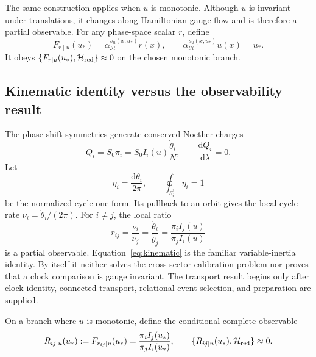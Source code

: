 \documentclass[11pt]{article}
\theoremstyle{plain}
\newcommand{\dd}{\mathrm d}
\begin{document}
The same construction applies when $u$ is monotonic. Although $u$ is invariant under translations, it changes along Hamiltonian gauge flow and is therefore a partial observable. For any phase-space scalar $r$, define
\begin{equation}
F_{r\mid u}(u_*)=\alpha_{\mathcal H}^{s_u(x,u_*)}r(x),\qquad
\alpha_{\mathcal H}^{s_u(x,u_*)}u(x)=u_*.
\end{equation}
It obeys $\{F_{r\mid u}(u_*),\mathcal H_{\rm red}\}\approx0$ on the chosen monotonic branch.

\subsection{Kinematic identity versus the observability result}

The phase-shift symmetries generate conserved Noether charges
\begin{equation}
Q_i=S_0\pi_i=S_0I_i(u)\frac{\dot\theta_i}{N},\qquad \frac{\dd Q_i}{\dd\lambda}=0.
\end{equation}
Let
\begin{equation}
\eta_i=\frac{\dd\theta_i}{2\pi},\qquad\oint_{S_i^1}\eta_i=1
\end{equation}
be the normalized cycle one-form.  Its pullback to an orbit gives the local
cycle rate $\nu_i=\dot\theta_i/(2\pi)$.  For $i\ne j$, the local ratio
\begin{equation}
r_{ij}=\frac{\nu_i}{\nu_j}
=\frac{\dot\theta_i}{\dot\theta_j}
=\frac{\pi_iI_j(u)}{\pi_jI_i(u)}
\label{eq:kinematic}
\end{equation}
is a partial observable.  Equation~\eqref{eq:kinematic} is the familiar
variable-inertia identity.  By itself it neither solves the cross-sector
calibration problem nor proves that a clock comparison is gauge invariant.
The transport result begins only after clock identity, connected transport,
relational event selection, and preparation are supplied.

On a branch where $u$ is monotonic, define the conditional complete observable
\begin{equation}
R_{ij\mid u}(u_*):=F_{r_{ij}\mid u}(u_*)
=\frac{\pi_iI_j(u_*)}{\pi_jI_i(u_*)},
\qquad
\{R_{ij\mid u}(u_*),\mathcal H_{\rm red}\}\approx0.
\end{equation}
\end{document}
